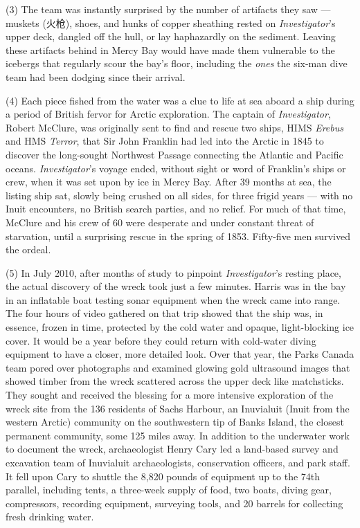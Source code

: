 \documentclass[UTF8,11pt]{ctexart}
\begin{document}
(3) The team was instantly surprised by the number of artifacts they saw — muskets (火枪), shoes, and hunks of copper sheathing rested on \textit{Investigator}’s upper deck, dangled off the hull, or lay haphazardly on the sediment. Leaving these artifacts behind in Mercy Bay would have made them vulnerable to the icebergs that regularly scour the bay’s floor, including the \textit{ones} the six-man dive team had been dodging since their arrival.


(4) Each piece fished from the water was a clue to life at sea aboard a ship during a period of British fervor for Arctic exploration. The captain of \textit{Investigator}, Robert McClure, was originally sent to find and rescue two ships, HIMS \textit{Erebus} and HMS \textit{Terror}, that Sir John Franklin had led into the Arctic in 1845 to discover the long-sought Northwest Passage connecting the Atlantic and Pacific oceans. \textit{Investigator}’s voyage ended, without sight or word of Franklin’s ships or crew, when it was set upon by ice in Mercy Bay. After 39 months at sea, the listing ship sat, slowly being crushed on all sides, for three frigid years — with no Inuit encounters, no British search parties, and no relief. For much of that time, McClure and his crew of 60 were desperate and under constant threat of starvation, until a surprising rescue in the spring of 1853. Fifty-five men survived the ordeal.


(5) In July 2010, after months of study to pinpoint \textit{Investigator}’s resting place, the actual discovery of the wreck took just a few minutes. Harris was in the bay in an inflatable boat testing sonar equipment when the wreck came into range. The four hours of video gathered on that trip showed that the ship was, in essence, frozen in time, protected by the cold water and opaque, light-blocking ice cover. It would be a year before they could return with cold-water diving equipment to have a closer, more detailed look. Over that year, the Parks Canada team pored over photographs and examined glowing gold ultrasound images that showed timber from the wreck scattered across the upper deck like matchsticks. They sought and received the blessing for a more intensive exploration of the wreck site from the 136 residents of Sachs Harbour, an Inuvialuit (Inuit from the western Arctic) community on the southwestern tip of Banks Island, the closest permanent community, some 125 miles away. In addition to the underwater work to document the wreck, archaeologist Henry Cary led a land-based survey and excavation team of Inuvialuit archaeologists, conservation officers, and park staff. It fell upon Cary to shuttle the 8,820 pounds of equipment up to the 74th parallel, including tents, a three-week supply of food, two boats, diving gear, compressors, recording equipment, surveying tools, and 20 barrels for collecting fresh drinking water.
\end{document}
